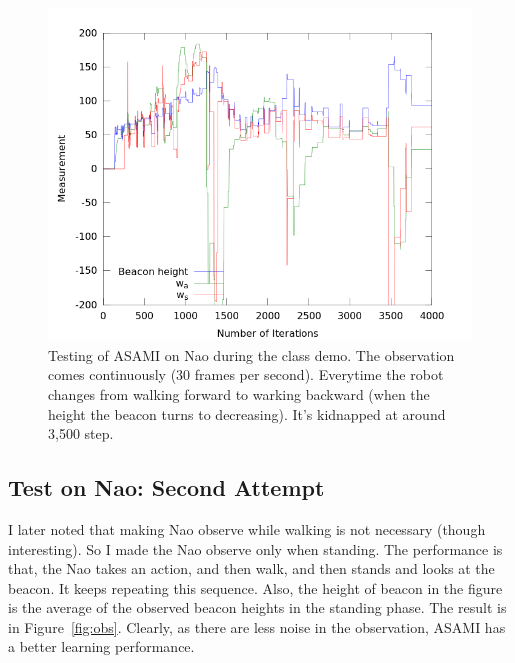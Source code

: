 \documentclass[10pt]{IEEEtran}
\begin{document}
\begin{figure}
\centering
\includegraphics[width=\columnwidth]{demoResult.png}
\caption{Testing of ASAMI on Nao during the class demo. The
observation comes continuously (30 frames per second). Everytime the
robot changes from walking forward to warking backward (when the
height the beacon turns to decreasing). It's kidnapped at around 3,500
step.}
\label{fig:demo}
\end{figure}

\subsection{Test on Nao: Second Attempt}

I later noted that making Nao observe while walking is not necessary
(though interesting). So I made the Nao observe only when standing.
The performance is that, the Nao takes an action, and then walk, and
then stands and looks at the beacon. It keeps repeating this sequence.
Also, the height of beacon in the figure is the average of the
observed beacon heights in the standing phase. The result is in
Figure~\ref{fig:obs}. Clearly, as there are less noise in the
observation, ASAMI has a better learning performance.
\end{document}
